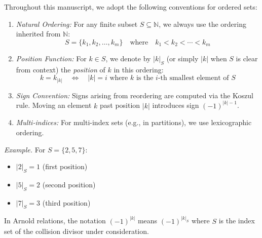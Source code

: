 \begin{convention}\label{conv:set-ordering-arnold}
Throughout this manuscript, we adopt the following conventions for ordered sets:

\begin{enumerate}
\item \emph{Natural Ordering:} For any finite subset $S \subseteq \mathbb{N}$, 
we always use the ordering inherited from $\mathbb{N}$:
\[S = \{k_1, k_2, \ldots, k_m\} \quad \text{where} \quad k_1 < k_2 < \cdots < k_m\]

\item \emph{Position Function:} For $k \in S$, we denote by $|k|_S$ (or simply $|k|$ 
when $S$ is clear from context) the \emph{position} of $k$ in this ordering:
\[k = k_{|k|} \quad \iff \quad |k| = i \text{ where } k \text{ is the } i\text{-th smallest element of } S\]

\item \emph{Sign Convention:} Signs arising from reordering are computed via the 
Koszul rule. Moving an element $k$ past position $|k|$ introduces sign $(-1)^{|k|-1}$.

\item \emph{Multi-indices:} For multi-index sets (e.g., in partitions), we use 
lexicographic ordering.
\end{enumerate}

\emph{Example.} For $S = \{2, 5, 7\}$:
\begin{itemize}
\item $|2|_S = 1$ (first position)
\item $|5|_S = 2$ (second position)  
\item $|7|_S = 3$ (third position)
\end{itemize}

In Arnold relations, the notation $(-1)^{|k|}$ means $(-1)^{|k|_S}$ where $S$ is the 
index set of the collision divisor under consideration.
\end{convention}

